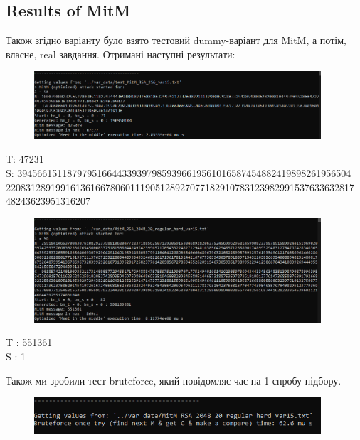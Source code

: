 \subsection{Results of MitM}
Також згідно варіанту було взято тестовий dummy-варіант для MitM, а потім, власне, real завдання. Отримані наступні результати: 

\begin{figure}[!ht]
    \centering
    \begin{minipage}{0.95\linewidth}
        \includegraphics[width=0.95\textwidth, scale=1.5]{ReportPic/report_4_MitM_test.png}
    \end{minipage}
\end{figure}

\noindent T: 47231 \\ 
S: 3945661511879795166443393979859396619561016587454882419898261956504 \\
2208312891991613616678060111905128927077182910783123982991537633632817 \\
48243623951316207

\begin{figure}[!ht]
    \centering
    \begin{minipage}{0.95\linewidth}
        \includegraphics[width=0.95\textwidth, scale=1.5]{ReportPic/report_5_MitM_hard.png}
    \end{minipage}
\end{figure}

\noindent T : 551361 \\ 
S : 1

Також ми зробили тест bruteforce, який повідомляє час на 1 спробу підбору.
\begin{figure}[!ht]
    \centering
    \begin{minipage}{0.95\linewidth}
        \includegraphics[width=0.95\textwidth, scale=1.5]{ReportPic/report_6_brutforce_hard.png}
    \end{minipage}
\end{figure}

